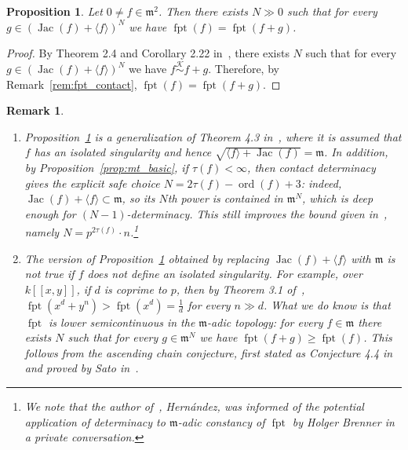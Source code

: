 \documentclass{article}
\newtheorem{proposition}[theorem]{Proposition}
\newtheorem{remark}[theorem]{Remark}
\DeclareMathOperator{\ord}{ord}
\DeclareMathOperator{\Jac}{Jac}
\DeclareMathOperator{\fpt}{fpt}
\newcommand{\equivk}{\overset{\mathcal{K}}{\sim}}
\numberwithin{theorem}{section}
\begin{document}
\begin{proposition}\label{prop:det_fpt_m-adic}
Let $0\neq f\in\mathfrak{m}^2$. Then there exists $N\gg0$ such that for every $g\in(\Jac(f)+\langle f\rangle)^N$ we have $\fpt(f)=\fpt(f+g)$.
\end{proposition}

\begin{proof}
By Theorem 2.4 and Corollary 2.22 in~\cite{svoray2025detecting}, there exists $N$ such that for every $g\in(\Jac(f)+\langle f\rangle)^N$ we have $f\equivk f+g$. Therefore, by Remark~\ref{rem:fpt_contact}, $\fpt(f)=\fpt(f+g)$.
\end{proof}

\begin{remark}
\begin{enumerate}
    \item \textup{Proposition~\ref{prop:det_fpt_m-adic} is a generalization of Theorem 4.3 in~\cite{hernandez2018local}, where it is assumed that $f$ has an isolated singularity and hence $\sqrt{\langle f\rangle+\Jac(f)}=\mathfrak{m}$. In addition, by Proposition~\ref{prop:mt_basic}, if $\tau(f)<\infty$, then contact determinacy gives the explicit safe choice $N=2\tau(f)-\ord(f)+3$: indeed, $\Jac(f)+\langle f\rangle\subset\mathfrak{m}$, so its $N$th power is contained in $\mathfrak{m}^{N}$, which is deep enough for $(N-1)$-determinacy. This still improves the bound given in~\cite{hernandez2018local}, namely $N=p^{2\tau(f)}\cdot n$.\footnote{We note that the author of~\cite{hernandez2018local}, Hern\'{a}ndez, was informed of the potential application of determinacy to $\mathfrak{m}$-adic constancy of $\fpt$ by Holger Brenner in a private conversation.}}
    \item \textup{The version of Proposition~\ref{prop:det_fpt_m-adic} obtained by replacing $\Jac(f)+\langle f\rangle$ with $\mathfrak{m}$ is not true if $f$ does not define an isolated singularity. For example, over $k[[x,y]]$, if $d$ is coprime to $p$, then by Theorem 3.1 of~\cite{hernandez2015F}, $\fpt(x^d+y^n)>\fpt(x^d)=\frac1d$ for every $n\gg d$. What we do know is that $\fpt$ is lower semicontinuous in the $\mathfrak{m}$-adic topology: for every $f\in\mathfrak{m}$ there exists $N$ such that for every $g\in\mathfrak{m}^N$ we have $\fpt(f+g)\geq\fpt(f)$. This follows from the ascending chain conjecture, first stated as Conjecture 4.4 in~\cite{blickle2009F} and proved by Sato in~\cite{sato2019ascending}.}
\end{enumerate}
\end{remark}
\end{document}

